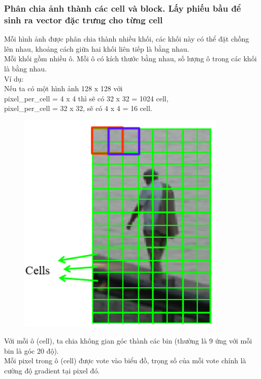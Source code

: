 \documentclass[../report.tex]{subfiles}
\begin{document}
\subsubsection{Phân chia ảnh thành các cell và block. 
Lấy phiếu bầu để sinh ra vector đặc trưng cho từng cell}
Mỗi hình ảnh được phân chia thành nhiều khối, 
các khối này có thể đặt chồng lên nhau, 
khoảng cách giữa hai khối liên tiếp là bằng nhau. \\[3mm]
Mỗi khối gồm nhiều ô. Mỗi ô có kích thước bằng nhau, 
số lượng ô trong các khối là bằng nhau. \\[3mm]
Ví dụ: \\
Nếu ta có một hình ảnh 128 x 128 với  \\
pixel\_per\_cell = 4 x 4 thì sẽ có 32 x 32 = 1024 cell,  \\
pixel\_per\_cell = 32 x 32, sẽ có 4 x 4 = 16 cell. 
\begin{figure}[H]
\centering
\includegraphics[width=10cm]{figures/cell-block.png}
\end{figure}
\noindent Với mỗi ô (cell), ta chia không gian góc thành 
các bin (thường là 9 ứng với mỗi bin là góc 20 độ).
\\[3mm]
Mỗi pixel trong ô (cell) được vote vào biểu đồ, 
trọng số của mỗi vote chính là cường độ gradient tại pixel đó.
\end{document}
